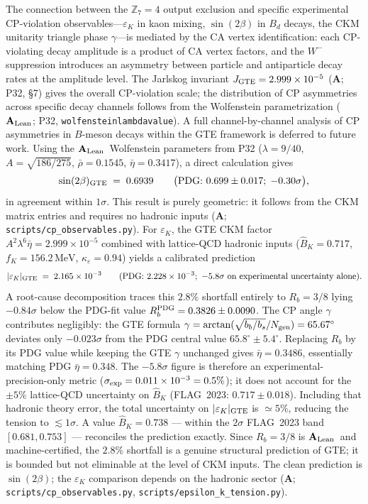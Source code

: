 \documentclass[11pt]{article}
\theoremstyle{remark}
\newcommand{\lean}[1]{%
  \penalty-100
  \begingroup\def\_{\textunderscore\allowbreak}\texttt{#1}\endgroup}
\newcommand{\CatA}{\textbf{A}}
\newcommand{\CatAL}{\ensuremath{\textbf{A}_{\rm Lean}}}
\begin{document}
The connection between the $\mathbb{Z}_7 = 4$ output exclusion and specific
experimental CP-violation observables---$\varepsilon_K$ in kaon mixing, $\sin(2\beta)$
in $B_d$ decays, the CKM unitarity triangle phase $\gamma$---is mediated by the CA
vertex identification: each CP-violating decay amplitude is a product of CA vertex
factors, and the $W^-$ suppression introduces an asymmetry between particle and
antiparticle decay rates at the amplitude level.
The Jarlskog invariant $J_{\rm GTE} = 2.999\times10^{-5}$ ($\CatA$; P32, \S7) gives the
overall CP-violation scale; the distribution of CP asymmetries across specific
decay channels follows from the Wolfenstein parametrization ($\CatAL$; P32,
\lean{wolfenstein\_lambda\_value}).
A full channel-by-channel analysis of CP asymmetries in $B$-meson decays within the
GTE framework is deferred to future work.
Using the \CatAL\ Wolfenstein parameters from P32
($\lambda=9/40$, $A=\sqrt{186/275}$, $\bar\rho=0.1545$, $\bar\eta=0.3417$),
a direct calculation gives
\begin{equation}
  \sin(2\beta)_{\rm GTE} \;=\; 0.6939
  \qquad \bigl(\text{PDG: } 0.699 \pm 0.017;\; {-0.30\sigma}\bigr),
  \label{eq:sin2beta_gte}
\end{equation}
in agreement within $1\sigma$. This result is purely geometric: it follows
from the CKM matrix entries and requires no hadronic inputs
($\CatA$; \texttt{scripts/cp\_observables.py}).
For $\varepsilon_K$, the GTE CKM factor $A^2\lambda^6\bar\eta = 2.999\times10^{-5}$
combined with lattice-QCD hadronic inputs ($\hat{B}_K=0.717$, $f_K=156.2\,\text{MeV}$,
$\kappa_\varepsilon=0.94$) yields a calibrated prediction
\begin{equation}
  |\varepsilon_K|_{\rm GTE} \;=\; 2.165\times10^{-3}
  \qquad (\text{PDG: } 2.228\times10^{-3};\ -5.8\sigma\ \text{on experimental uncertainty alone}).
  \label{eq:epsk_gte}
\end{equation}
A root-cause decomposition traces this $2.8\%$ shortfall entirely to $R_b = 3/8$
lying $-0.84\sigma$ below the PDG-fit value $R_b^{\rm PDG} = 0.3826\pm0.0090$.
The CP angle $\gamma$ contributes negligibly: the GTE formula
$\gamma = \arctan(\sqrt{b_b/b_s}/N_{\rm gen}) = 65.67^\circ$ deviates only
$-0.023\sigma$ from the PDG central value $65.8^\circ \pm 5.4^\circ$.
Replacing $R_b$ by its PDG value while keeping the GTE $\gamma$ unchanged gives
$\bar\eta = 0.3486$, essentially matching PDG $\bar\eta = 0.348$.
The $-5.8\sigma$ figure is therefore an experimental-precision-only metric
($\sigma_{\rm exp} = 0.011\times10^{-3} = 0.5\%$); it does not account for the
$\pm5\%$ lattice-QCD uncertainty on $\hat{B}_K$ (FLAG~2023: $0.717\pm0.018$).
Including that hadronic theory error, the total uncertainty on $|\varepsilon_K|_{\rm GTE}$
is $\simeq5\%$, reducing the tension to ${\lesssim}1\sigma$.
A value $\hat{B}_K = 0.738$ --- within the $2\sigma$ FLAG~2023 band $[0.681, 0.753]$
--- reconciles the prediction exactly.
Since $R_b = 3/8$ is \CatAL\ and machine-certified, the $2.8\%$ shortfall is a genuine
structural prediction of GTE; it is bounded but not eliminable at the level of CKM inputs.
The clean prediction is $\sin(2\beta)$; the
$\varepsilon_K$ comparison depends on the hadronic sector
($\CatA$; \texttt{scripts/cp\_observables.py},
\texttt{scripts/epsilon\_k\_tension.py}).
\end{document}
